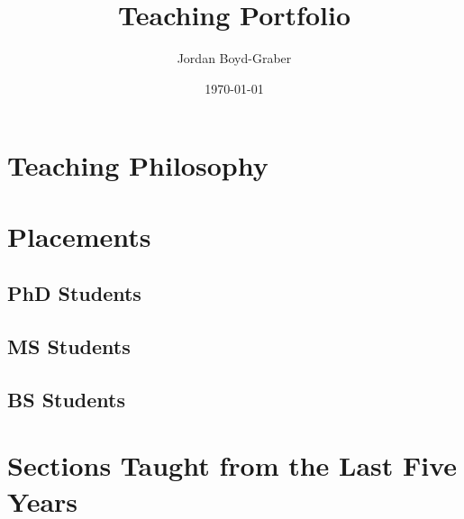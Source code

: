 \documentclass{article}
\title{Teaching Portfolio}
\author{Jordan Boyd-Graber}
\date{ \today}
\begin{document}
\maketitle

\tableofcontents

\section{Teaching Philosophy}



\clearpage

\section{Placements}

\subsection{PhD Students}



\subsection{MS Students}



\subsection{BS Students}



\clearpage

\section{Sections Taught from the Last Five Years}
\end{document}
